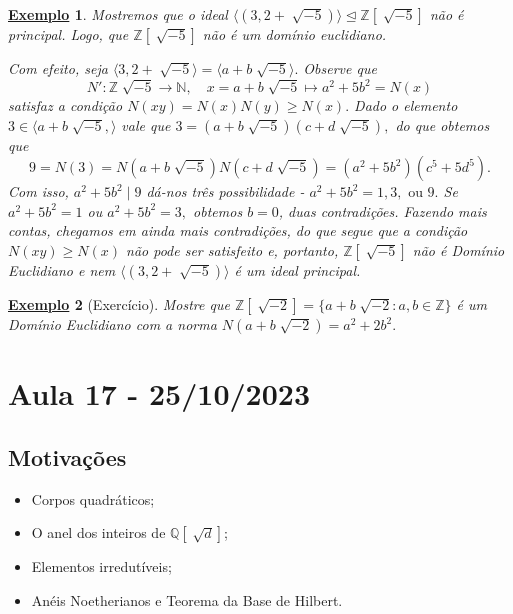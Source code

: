 \documentclass{article}
\newtheorem{example}{\underline{Exemplo}}
\begin{document}
\begin{example}
  Mostremos que o ideal \(\langle (3, 2 + \sqrt[]{-5}) \rangle \trianglelefteq{\mathbb{Z}[\sqrt[]{-5}]}\) não é principal. Logo, que
 \(\mathbb{Z}[\sqrt[]{-5}]\) não é um domínio euclidiano.

  Com efeito, seja \(\langle 3, 2 + \sqrt[]{-5} \rangle = \langle a + b\sqrt[]{-5} \rangle.\) Observe que 
    \[
      N':\mathbb{Z}\sqrt[]{-5}\rightarrow \mathbb{N},\quad x = a+b\sqrt[]{-5}\mapsto a^{2}+5b^{2} = N(x)
    \]
satisfaz a condição \(N(xy) = N(x)N(y)\geq N(x).\) Dado o elemento \(3\in \langle a + b\sqrt[]{-5}, \rangle\)
vale que \(3 = (a+b\sqrt[]{-5})(c+d\sqrt[]{-5}),\) do que obtemos que 
  \[
    9 = N(3) = N(a+b\sqrt[]{-5})N(c+d\sqrt[]{-5}) = (a^{2}+5b^{2})(c^{5}+5d^{5}).
  \]
Com isso, \(a^{2}+5b^{2}\mid 9\) dá-nos três possibilidade - \(a^{2} + 5b^{2} = 1, 3,\text{ ou }9.\)
Se \(a^{2} + 5b^{2} = 1\) ou \(a^{2} + 5b^{2} = 3,\) obtemos \(b = 0\), duas contradições. Fazendo mais contas,
chegamos em ainda mais contradições, do que segue que a condição \(N(xy)\geq N(x)\) não pode ser satisfeito e, portanto,
 \(\mathbb{Z}[\sqrt[]{-5}]\) não é Domínio Euclidiano e nem \(\langle (3, 2+\sqrt[]{-5}) \rangle\) é um ideal principal.
\end{example}
 \begin{example}[Exercício]
  Mostre que \(\mathbb{Z}[\sqrt[]{-2}] = \{a + b\sqrt[]{-2}: a, b\in \mathbb{Z}\}\) é um Domínio
Euclidiano com a norma \(N(a+b\sqrt[]{-2}) = a^{2} + 2b^{2}.\)
\end{example}
 \newpage

\section{Aula 17 - 25/10/2023}
\subsection{Motivações} 
\begin{itemize}
  \item Corpos quadráticos;
  \item O anel dos inteiros de \(\mathbb{Q}[\sqrt[]{d}]\);
  \item Elementos irredutíveis;
  \item Anéis Noetherianos e Teorema da Base de Hilbert.
\end{itemize}
\end{document}
